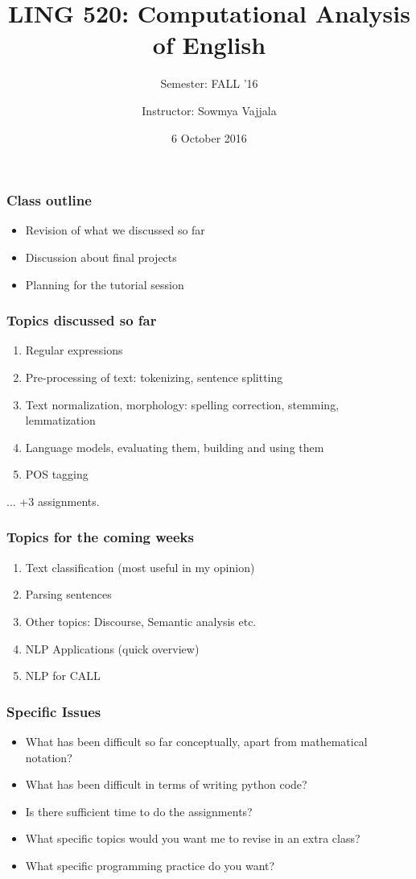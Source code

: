 \documentclass{beamer}
\author[Sowmya Vajjala]{Instructor: Sowmya Vajjala}
\title[LING 520]{LING 520: Computational Analysis of English}
\subtitle{Semester: FALL '16}
\date{6 October 2016}
\institute{Iowa State University, USA}
\begin{document}
\begin{frame}\titlepage
\end{frame}

\begin{frame}
\frametitle{Class outline}
\begin{itemize}
\item Revision of what we discussed so far
\item Discussion about final projects
\item Planning for the tutorial session
\end{itemize}
\end{frame}

\begin{frame}
\frametitle{Topics discussed so far}
\begin{enumerate}
\item Regular expressions
\item Pre-processing of text: tokenizing, sentence splitting
\item Text normalization, morphology: spelling correction, stemming, lemmatization
\item Language models, evaluating them, building and using them
\item POS tagging
\end{enumerate}
 ... +3 assignments.
\end{frame}

\begin{frame}
\frametitle{Topics for the coming weeks}
\begin{enumerate}
\item Text classification (most useful in my opinion)
\item Parsing sentences
\item Other topics: Discourse, Semantic analysis etc.
\item NLP Applications (quick overview)
\item NLP for CALL
\end{enumerate}
\end{frame}

\begin{frame}
\frametitle{Specific Issues}
\begin{itemize}
\item What has been difficult so far conceptually, apart from mathematical notation? \pause
\item What has been difficult in terms of writing python code? \pause
\item Is there sufficient time to do the assignments? \pause
\item What specific topics would you want me to revise in an extra class? \pause
\item What specific programming practice do you want?
\end{itemize}
\end{frame}
\end{document}
